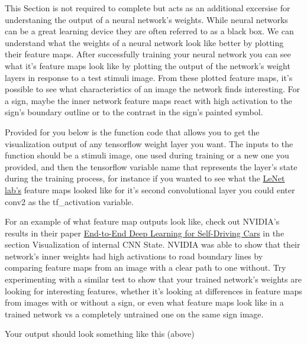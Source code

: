 \documentclass[11pt]{article}
\begin{document}
This Section is not required to complete but acts as an additional
excersise for understaning the output of a neural network's weights.
While neural networks can be a great learning device they are often
referred to as a black box. We can understand what the weights of a
neural network look like better by plotting their feature maps. After
successfully training your neural network you can see what it's feature
maps look like by plotting the output of the network's weight layers in
response to a test stimuli image. From these plotted feature maps, it's
possible to see what characteristics of an image the network finds
interesting. For a sign, maybe the inner network feature maps react with
high activation to the sign's boundary outline or to the contrast in the
sign's painted symbol.

Provided for you below is the function code that allows you to get the
visualization output of any tensorflow weight layer you want. The inputs
to the function should be a stimuli image, one used during training or a
new one you provided, and then the tensorflow variable name that
represents the layer's state during the training process, for instance
if you wanted to see what the
\href{https://classroom.udacity.com/nanodegrees/nd013/parts/fbf77062-5703-404e-b60c-95b78b2f3f9e/modules/6df7ae49-c61c-4bb2-a23e-6527e69209ec/lessons/601ae704-1035-4287-8b11-e2c2716217ad/concepts/d4aca031-508f-4e0b-b493-e7b706120f81}{LeNet
lab's} feature maps looked like for it's second convolutional layer you
could enter conv2 as the tf\_activation variable.

For an example of what feature map outputs look like, check out NVIDIA's
results in their paper
\href{https://devblogs.nvidia.com/parallelforall/deep-learning-self-driving-cars/}{End-to-End
Deep Learning for Self-Driving Cars} in the section Visualization of
internal CNN State. NVIDIA was able to show that their network's inner
weights had high activations to road boundary lines by comparing feature
maps from an image with a clear path to one without. Try experimenting
with a similar test to show that your trained network's weights are
looking for interesting features, whether it's looking at differences in
feature maps from images with or without a sign, or even what feature
maps look like in a trained network vs a completely untrained one on the
same sign image.

Your output should look something like this (above)
\end{document}
